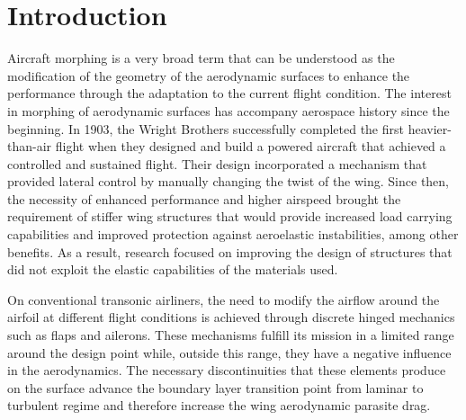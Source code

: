 \chapter{Introduction} \label{chap:introduction}


Aircraft morphing is a very broad term that can be understood as the modification of the geometry of the aerodynamic surfaces to enhance the performance through the adaptation to the current flight condition. The interest in morphing of aerodynamic surfaces has accompany aerospace history since the beginning. In 1903, the Wright Brothers successfully completed the first heavier-than-air flight when they designed and build a powered aircraft that achieved a controlled and sustained flight. Their design incorporated a mechanism that provided lateral control by manually changing the twist of the wing. Since then, the necessity of enhanced performance and higher airspeed brought the requirement of stiffer wing structures that would provide increased load carrying capabilities and improved protection against aeroelastic instabilities, among other benefits. As a result, research focused on improving the design of structures that did not exploit the elastic capabilities of the materials used.

On conventional transonic airliners, the need to modify the airflow around the airfoil at different flight conditions is achieved through discrete hinged mechanics such as flaps and ailerons. These mechanisms fulfill its mission in a limited range around the design point while, outside this range, they have a negative influence in the aerodynamics. The necessary discontinuities that these elements produce on the surface advance the boundary layer transition point from laminar to turbulent regime and therefore increase the wing aerodynamic parasite drag. 

